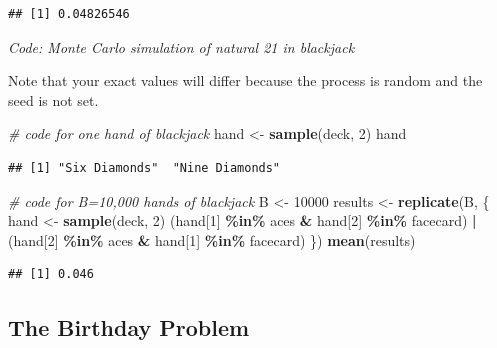 \documentclass[
]{article}
\newenvironment{Shaded}{\begin{snugshade}}{\end{snugshade}}
\newcommand{\CommentTok}[1]{\textcolor[rgb]{0.56,0.35,0.01}{\textit{#1}}}
\newcommand{\DecValTok}[1]{\textcolor[rgb]{0.00,0.00,0.81}{#1}}
\newcommand{\KeywordTok}[1]{\textcolor[rgb]{0.13,0.29,0.53}{\textbf{#1}}}
\newcommand{\NormalTok}[1]{#1}
\newcommand{\OperatorTok}[1]{\textcolor[rgb]{0.81,0.36,0.00}{\textbf{#1}}}
\newcommand{\StringTok}[1]{\textcolor[rgb]{0.31,0.60,0.02}{#1}}
\begin{document}
\begin{verbatim}
## [1] 0.04826546
\end{verbatim}

\emph{Code: Monte Carlo simulation of natural 21 in blackjack}

Note that your exact values will differ because the process is random
and the seed is not set.

\begin{Shaded}
\begin{Highlighting}[]
\CommentTok{\# code for one hand of blackjack}
\NormalTok{hand \textless{}{-}}\StringTok{ }\KeywordTok{sample}\NormalTok{(deck, }\DecValTok{2}\NormalTok{)}
\NormalTok{hand}
\end{Highlighting}
\end{Shaded}

\begin{verbatim}
## [1] "Six Diamonds"  "Nine Diamonds"
\end{verbatim}

\begin{Shaded}
\begin{Highlighting}[]
\CommentTok{\# code for B=10,000 hands of blackjack}
\NormalTok{B \textless{}{-}}\StringTok{ }\DecValTok{10000}
\NormalTok{results \textless{}{-}}\StringTok{ }\KeywordTok{replicate}\NormalTok{(B, \{}
\NormalTok{  hand \textless{}{-}}\StringTok{ }\KeywordTok{sample}\NormalTok{(deck, }\DecValTok{2}\NormalTok{)}
\NormalTok{  (hand[}\DecValTok{1}\NormalTok{] }\OperatorTok{\%in\%}\StringTok{ }\NormalTok{aces }\OperatorTok{\&}\StringTok{ }\NormalTok{hand[}\DecValTok{2}\NormalTok{] }\OperatorTok{\%in\%}\StringTok{ }\NormalTok{facecard) }\OperatorTok{|}\StringTok{ }\NormalTok{(hand[}\DecValTok{2}\NormalTok{] }\OperatorTok{\%in\%}\StringTok{ }\NormalTok{aces }\OperatorTok{\&}\StringTok{ }\NormalTok{hand[}\DecValTok{1}\NormalTok{] }\OperatorTok{\%in\%}\StringTok{ }\NormalTok{facecard)}
\NormalTok{\})}
\KeywordTok{mean}\NormalTok{(results)}
\end{Highlighting}
\end{Shaded}

\begin{verbatim}
## [1] 0.046
\end{verbatim}

\hypertarget{the-birthday-problem}{%
\subsection{The Birthday Problem}\label{the-birthday-problem}}
\end{document}
